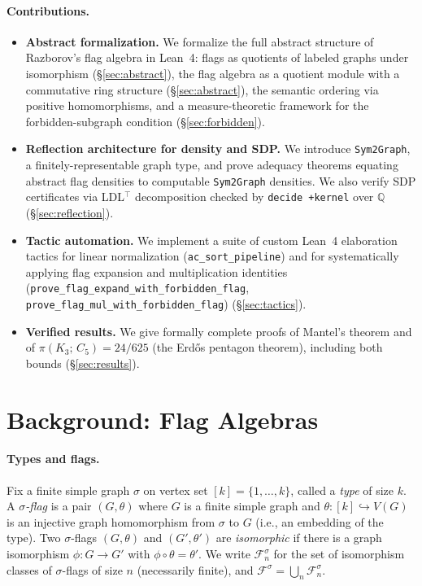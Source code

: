 \documentclass{article}
\newcommand{\Q}{\mathbb{Q}}
\newcommand{\Flag}[1]{\mathcal{F}^{#1}}
\newcommand{\tdensity}[2]{\pi(#1;\,#2)}
\newcommand{\lean}[1]{\texttt{#1}}
\begin{document}
\paragraph{Contributions.}
\begin{itemize}
  \item \textbf{Abstract formalization.}  We formalize the full abstract
    structure of Razborov's flag algebra in Lean~4: flags as quotients of
    labeled graphs under isomorphism (\S\ref{sec:abstract}), the flag algebra as
    a quotient module with a commutative ring structure
    (\S\ref{sec:abstract}), the semantic ordering via positive homomorphisms, and
    a measure-theoretic framework for the forbidden-subgraph condition
    (\S\ref{sec:forbidden}).

  \item \textbf{Reflection architecture for density and SDP.}  We introduce
    \lean{Sym2Graph}, a finitely-representable graph type, and prove adequacy
    theorems equating abstract flag densities to computable \lean{Sym2Graph}
    densities.  We also verify SDP certificates via LDL$^\top$ decomposition
    checked by \lean{decide +kernel} over $\Q$ (\S\ref{sec:reflection}).

  \item \textbf{Tactic automation.}  We implement a suite of custom Lean~4
    elaboration tactics for linear normalization (\lean{ac\_sort\_pipeline})
    and for systematically applying flag expansion and multiplication identities
    (\lean{prove\_flag\_expand\_with\_forbidden\_flag},
    \lean{prove\_flag\_mul\_with\_forbidden\_flag}) (\S\ref{sec:tactics}).

  \item \textbf{Verified results.}  We give formally complete proofs of
    Mantel's theorem and of $\tdensity{K_3}{C_5} = 24/625$ (the Erd\H{o}s
    pentagon theorem), including both bounds (\S\ref{sec:results}).
\end{itemize}

\section{Background: Flag Algebras}
\label{sec:background}

\paragraph{Types and flags.}
Fix a finite simple graph $\sigma$ on vertex set $[k] = \{1,\ldots,k\}$,
called a \emph{type} of size $k$.  A \emph{$\sigma$-flag} is a pair
$(G, \theta)$ where $G$ is a finite simple graph and
$\theta : [k] \hookrightarrow V(G)$ is an injective graph homomorphism from
$\sigma$ to $G$ (i.e., an embedding of the type).  Two $\sigma$-flags
$(G,\theta)$ and $(G',\theta')$ are \emph{isomorphic} if there is a graph
isomorphism $\phi : G \to G'$ with $\phi \circ \theta = \theta'$.  We write
$\Flag{\sigma}_n$ for the set of isomorphism classes of $\sigma$-flags of size
$n$ (necessarily finite), and $\Flag{\sigma} = \bigcup_n \Flag{\sigma}_n$.
\end{document}
